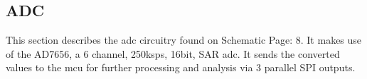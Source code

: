 \subsection{ADC}

This section describes the \gls{adc} circuitry found on Schematic Page: 8. It makes use of the AD7656, a 6 channel, 250ksps, 16bit, SAR \gls{adc}. It sends the converted values to the \gls{mcu} for further processing and analysis via 3 parallel SPI outputs.

